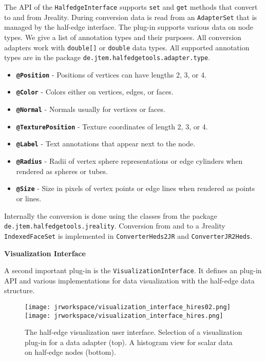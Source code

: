 \documentclass[Thesis.tex]{subfiles}
\begin{document}
The API of the {\tt HalfedgeInterface} supports {\tt set} and {\tt get} methods that convert to and from
{\sc Jreality}. During conversion data is read from an {\tt AdapterSet} that is managed by the half-edge
interface. The plug-in supports various data on node types. We give a list of annotation types and
their purposes. All conversion adapters work with {\tt double[]} or {\tt double} data types. All
supported annotation types are in the package {\tt de.jtem.halfedgetools.adapter.type}.

\begin{itemize}
\item {\tt\bf @Position} - Positions of vertices can have lengths 2, 3, or 4.
\item {\tt\bf @Color} - Colors either on vertices, edges, or faces.
\item {\tt\bf @Normal} - Normals usually for vertices or faces.
\item {\tt\bf @TexturePosition} - Texture coordinates of length 2, 3, or 4.
\item {\tt\bf @Label} - Text annotations that appear next to the node.
\item {\tt\bf @Radius} - Radii of vertex sphere representations or edge cylinders when rendered
as spheres or tubes.
\item {\tt\bf @Size} - Size in pixels of vertex points or edge lines when rendered as points or lines.
\end{itemize}

Internally the conversion is done using the classes from the package 
{\tt de.jtem.halfedge\-tools.jreality}. Conversion from and to a {\sc Jreality} {\tt IndexedFaceSet}
is implemented in {\tt ConverterHeds2JR} and {\tt ConverterJR2Heds}.

{\bf Visualization Interface}

A second important plug-in is the {\tt Visuali\-zation\-Inter\-face}. It defines
an plug-in API and various implementations for data visualization with the half-edge data structure. 


\begin{figure}
	\centering
	\texttt{[image: jrworkspace/visualization\_interface\_hires02.png]}
	\texttt{[image: jrworkspace/visualization\_interface\_hires.png]}
	\caption[Visualization Interface]{The half-edge visualization user interface. Selection of a visualization
		plug-in for a data adapter (top). A histogram view for scalar data on half-edge nodes (bottom).}
	\label{fig:visualization_interface}
\end{figure}
\end{document}
